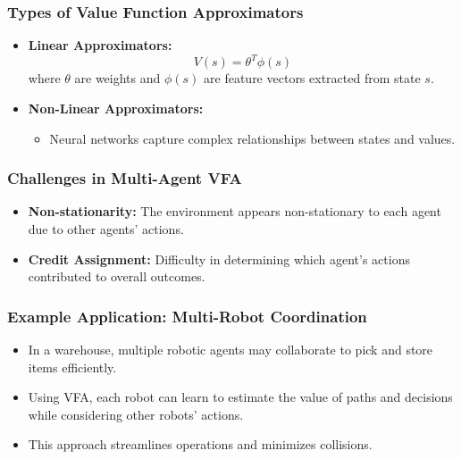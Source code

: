 \documentclass[aspectratio=169]{beamer}
\begin{document}
\begin{frame}[fragile]
    \frametitle{Types of Value Function Approximators}
    \begin{itemize}
        \item \textbf{Linear Approximators:}
        \begin{equation}
            V(s) = \theta^T \phi(s)
        \end{equation}
        where \( \theta \) are weights and \( \phi(s) \) are feature vectors extracted from state \( s \).
        
        \item \textbf{Non-Linear Approximators:} 
        \begin{itemize}
            \item Neural networks capture complex relationships between states and values.
        \end{itemize} 
    \end{itemize}
\end{frame}

\begin{frame}[fragile]
    \frametitle{Challenges in Multi-Agent VFA}
    \begin{itemize}
        \item \textbf{Non-stationarity:} The environment appears non-stationary to each agent due to other agents' actions.
        \item \textbf{Credit Assignment:} Difficulty in determining which agent's actions contributed to overall outcomes.
    \end{itemize}
\end{frame}

\begin{frame}[fragile]
    \frametitle{Example Application: Multi-Robot Coordination}
    \begin{itemize}
        \item In a warehouse, multiple robotic agents may collaborate to pick and store items efficiently.
        \item Using VFA, each robot can learn to estimate the value of paths and decisions while considering other robots' actions.
        \item This approach streamlines operations and minimizes collisions.
    \end{itemize}
\end{frame}
\end{document}
